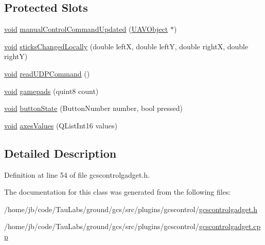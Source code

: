 \subsection*{\-Protected \-Slots}
\begin{DoxyCompactItemize}
\item 
\hyperlink{group___u_a_v_objects_plugin_ga444cf2ff3f0ecbe028adce838d373f5c}{void} \hyperlink{group___g_c_s_control_gadget_plugin_gaac625204097cbd30812c0143a80ce3ea}{manual\-Control\-Command\-Updated} (\hyperlink{class_u_a_v_object}{\-U\-A\-V\-Object} $\ast$)
\item 
\hyperlink{group___u_a_v_objects_plugin_ga444cf2ff3f0ecbe028adce838d373f5c}{void} \hyperlink{group___g_c_s_control_gadget_plugin_gae9a31787be607e3bf9b8b6b6a3e47983}{sticks\-Changed\-Locally} (double left\-X, double left\-Y, double right\-X, double right\-Y)
\item 
\hyperlink{group___u_a_v_objects_plugin_ga444cf2ff3f0ecbe028adce838d373f5c}{void} \hyperlink{group___g_c_s_control_gadget_plugin_ga69fe9e7fd531e69ac57247eb50f59874}{read\-U\-D\-P\-Command} ()
\item 
\hyperlink{group___u_a_v_objects_plugin_ga444cf2ff3f0ecbe028adce838d373f5c}{void} \hyperlink{group___g_c_s_control_gadget_plugin_ga1cb6abc684939d2e560ae07ca3a72cda}{gamepads} (quint8 count)
\item 
\hyperlink{group___u_a_v_objects_plugin_ga444cf2ff3f0ecbe028adce838d373f5c}{void} \hyperlink{group___g_c_s_control_gadget_plugin_ga515dc70507cb41b37c46ed3fd9addc47}{button\-State} (\-Button\-Number number, bool pressed)
\item 
\hyperlink{group___u_a_v_objects_plugin_ga444cf2ff3f0ecbe028adce838d373f5c}{void} \hyperlink{group___g_c_s_control_gadget_plugin_ga575f8651147d4a9a96a360d3ac4c600f}{axes\-Values} (\-Q\-List\-Int16 values)
\end{DoxyCompactItemize}


\subsection{\-Detailed \-Description}


\-Definition at line 54 of file gcscontrolgadget.\-h.



\-The documentation for this class was generated from the following files\-:\begin{DoxyCompactItemize}
\item 
/home/jb/code/\-Tau\-Labs/ground/gcs/src/plugins/gcscontrol/\hyperlink{gcscontrolgadget_8h}{gcscontrolgadget.\-h}\item 
/home/jb/code/\-Tau\-Labs/ground/gcs/src/plugins/gcscontrol/\hyperlink{gcscontrolgadget_8cpp}{gcscontrolgadget.\-cpp}\end{DoxyCompactItemize}
